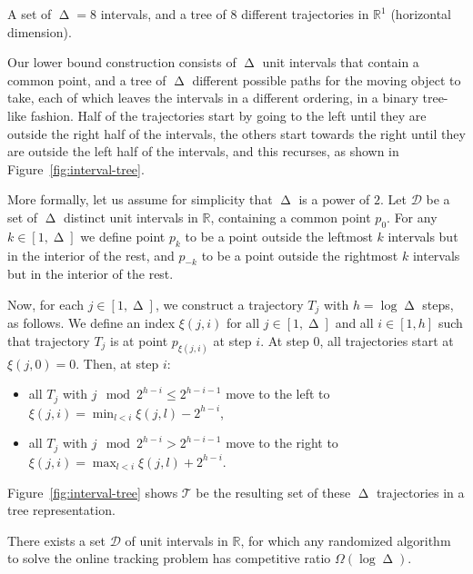 \documentclass[runningheads]{llncs}
\newcommand {\mathset} [1] {\ensuremath {\mathbb {#1}}}
\newcommand {\R} {\mathset {R}}
\newcommand {\script} [1] {\ensuremath {\mathcal {#1}}}
\DeclareMathOperator {\ply}{\Delta}
\begin{document}
 {A set of $\ply = 8$ intervals, and a tree of $8$ different trajectories in $\R^1$ (horizontal dimension).}

Our lower bound construction consists of $\ply$ unit intervals that contain a common point, and a tree of $\ply$ different possible paths for the moving object to take, each of which leaves the intervals in a different ordering, in a binary tree-like fashion. Half of the trajectories start by going to the left until they are outside the right half of the intervals, the others start towards the right until they are outside the left half of the intervals, and this recurses, as shown in Figure~\ref {fig:interval-tree}.

More formally, let us assume for simplicity that $\ply$ is a power of $2$.
Let $\script D$ be a set of $\ply$ distinct unit intervals in $\R$, containing a common point $p_0$.
For any $k \in [1, \ply]$ we define point $p_k$ to be a point outside the leftmost $k$ intervals but in the interior of the rest, and $p_{-k}$ to be a point outside the rightmost $k$ intervals but in the interior of the rest.

Now, for each $j \in [1, \ply]$, we construct a trajectory $T_j$ with $h = \log \ply$ steps, as follows. We define an index $\xi(j,i)$ for all $j \in [1, \ply]$ and all $i \in [1, h]$ such that trajectory $T_j$ is at point $p_{\xi(j,i)}$ at step $i$. At step $0$, all trajectories start at $\xi(j,0) = 0$.  Then, at step $i$:
      \begin {itemize}
        \item all $T_j$ with $j \mod 2^{h-i} \leq 2^{h-i-1}$ move to the left to $\xi(j,i) = \min_{l < i} \xi(j,l) - 2^{h-i}$,
        \item all $T_j$ with $j \mod 2^{h-i} > 2^{h-i-1}$ move to the right to $\xi(j,i) = \max_{l < i} \xi(j,l) + 2^{h-i}$.
      \end {itemize}
Figure~\ref {fig:interval-tree} shows $\script T$ be the resulting set of these $\ply$ trajectories in a tree representation.

\begin {theorem} \label {thm:lowerbound_random}
There exists a set $\script D$ of unit intervals in $\R$, for which any randomized algorithm to solve the online tracking problem has competitive ratio $\Omega (\log \ply)$.
\end {theorem}
      
\end{document}
